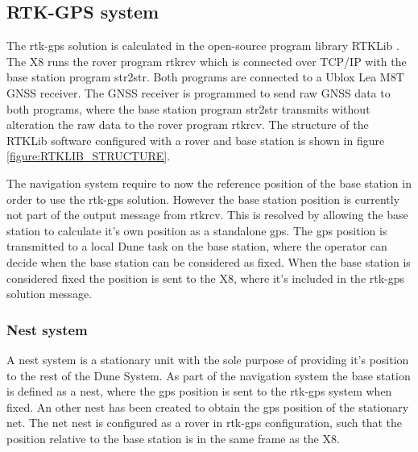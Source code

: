 \subsection{RTK-GPS system}
The \gls{rtk-gps} solution is calculated in the open-source program library RTKLib \citep{takasu2009development}.
The X8 runs the rover program rtkrcv which is connected over TCP/IP with the base station program str2str. Both programs are connected to a Ublox Lea M8T GNSS receiver. The GNSS receiver is programmed to send raw GNSS data to both programs, where the base station program str2str transmits without alteration the raw data to the rover program rtkrcv. The structure of the RTKLib software configured with a rover and base station is shown in figure \ref{figure:RTKLIB_STRUCTURE}.

The navigation system require to now the reference position of the base station in order to use the \gls{rtk-gps} solution. However the base station position is currently not part of the output message from rtkrcv. This is resolved by allowing the base station to calculate it's own position as a standalone \gls{gps}. The \gls{gps} position is transmitted to a local Dune task on the base station, where the operator can decide when the base station can be considered as fixed. When the base station is considered fixed the position is sent to the X8, where it's included in the \gls{rtk-gps} solution message.
\subsubsection{Nest system}
A nest system is a stationary unit with the sole purpose of providing it's position to the rest of the Dune System. As part of the navigation system the base station is defined as a nest, where the \gls{gps} position is sent to the \gls{rtk-gps} system when fixed.
An other nest has been created to obtain the \gls{gps} position of the stationary net. The net nest is configured as a rover in \gls{rtk-gps} configuration, such that the position relative to the base station is in the same frame as the X8.
